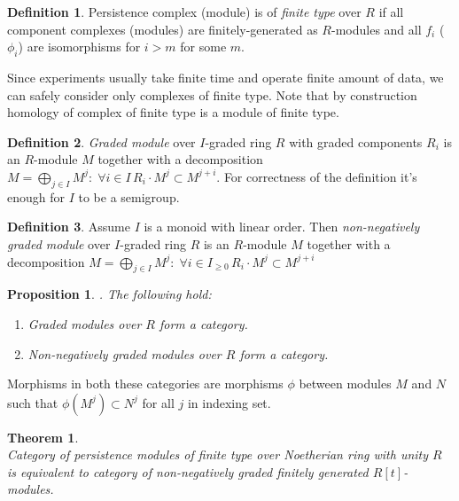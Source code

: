 \documentclass[a4paper, 12pt]{article}
\newtheorem{proposition}{Proposition}
\newtheorem{theorem}{Theorem}
\theoremstyle{definition}
\newtheorem{definition}{Definition}
\theoremstyle{remark}
\newcommand{\define}[1]{{\textit{#1}}}
\renewcommand{\geq}{\geqslant}
\begin{document}
\begin{definition}
  Persistence complex (module) is of \define{finite type} over $R$ if all component complexes (modules) are finitely-generated as $R$-modules and all $f_i$ ($\phi_i$) are isomorphisms for $i > m$ for some $m$.
\end{definition}

Since experiments usually take finite time and operate finite amount of data, we can safely consider only complexes of finite type. Note that by construction homology of complex of finite type is a module of finite type.\\

\begin{definition}
  \define{Graded module} over $I$-graded ring $R$ with graded components $R_i$ is an $R$-module $M$ together with a decomposition $M = \bigoplus_{j \in I} M^j:\; \forall i \in I\, R_i \cdot M^j \subset M^{j+i}$. For correctness of the definition it's enough for $I$ to be a semigroup.
\end{definition}

\begin{definition}
  Assume $I$ is a monoid with linear order. Then \define{non-negatively graded module} over $I$-graded ring $R$ is an $R$-module $M$ together with a decomposition $M = \bigoplus_{j \in I} M^j:\; \forall i \in I_{\geq 0}\, R_i \cdot M^j \subset M^{j+i}$
\end{definition}

\begin{proposition}. The following hold:
  \begin{enumerate}
    \item Graded modules over $R$ form a category.
    \item Non-negatively graded modules over $R$ form a category.
  \end{enumerate}
\end{proposition}

Morphisms in both these categories are morphisms $\phi$ between modules $M$ and $N$ such that $\phi(M^j) \subset N^j$ for all $j$ in indexing set.\\

\begin{theorem} {\cite[Theorem 3.1]{Zomorodian05}}\\
  Category of persistence modules of finite type over Noetherian ring with unity $R$ is equivalent to category of non-negatively graded finitely generated $R[t]$-modules.
\end{theorem}
\end{document}
